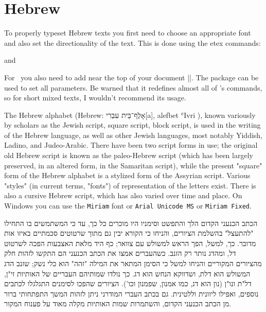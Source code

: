 \section{Hebrew}


\newfontfamily{}

To properly typeset Hebrew texts you first need to choose an appropriate font and also set the directionality of the text. This
is done using the etex commands:

\CMDI{\beginL} and \CMDI{\beginR} 

For \XeTeX\ you also need to add near the top of your document ||. The package  can be used to set all parameters. Be warned that it redefines almost all of \latexe's commands, so for short mixed texts, I wouldn't recommend its usage. 



The Hebrew alphabet (Hebrew: אָלֶף־בֵּית עִבְרִי[a], alefbet ʿIvri ), known variously by scholars as the Jewish script, square script, block script, is used in the writing of the Hebrew language, as well as other Jewish languages, most notably Yiddish, Ladino, and Judeo-Arabic. There have been two script forms in use; the original old Hebrew script is known as the paleo-Hebrew script (which has been largely preserved, in an altered form, in the Samaritan script), while the present "square" form of the Hebrew alphabet is a stylized form of the Assyrian script. Various "styles" (in current terms, "fonts") of representation of the letters exist. There is also a cursive Hebrew script, which has also varied over time and place. On Windows you can use the \texttt{Miriam} font or \texttt{Arial Unicode MS} or \texttt{Miriam Fixed}.
\medskip

\topline
\bgroup
\ifxetex{}\fi
\raggedleft\hebrew{}\beginR

הכתב הכנעני הקדום הלך והתפשט וסימניו היו מוכרים כל כך, עד כי המשתמשים בו התחילו "להתעצל" בהשלמת הציורים, והניחו כי הקורא יבין גם מתוך שרטוטים סכמתיים באיזו אות מדובר. כך, למשל, הפך הראש למשולש עם צוואר; כף היד מלאת האצבעות הפכה לשרטוט דל, ומהדג נותר רק הזנב. כשהעברים אמצו את הכתב הכנעני הם התקשו לזהות חלק מהציורים המקוריים והניחו למשל כי הסימן המתאר את המילה "זהה" הוא כלי נשק; שזנב הדג המשולש הוא דלת, ושדווקא הנחש הוא דג. כך נולדו שמותיהם העבריים של האותיות זי"ן, דל"ת ונו"ן (נון הוא דג, כמו אמנון, שפמנון וכו'). הציורים שהפכו לסימנים התגלגלו לכתבים נוספים, ואפילו ליוונית וללטינית. גם בכתב העברי המודרני ניתן לזהות המשך התפתחותי ברור מן הכתב הכנעני הקדום, והשתמרות שמות האותיות מקלה מאוד על פענוח המקור.


